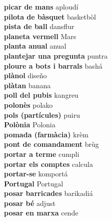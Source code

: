 \textbf{ picar de mans  } aploudí \\
\textbf{ pilota de bàsquet  } basketbòl \\
\textbf{ pista de ball  } dansflur \\
\textbf{ planeta vermell  } Mars \\
\textbf{ planta anual  } anual \\
\textbf{ plantejar una pregunta  } puntra \\
\textbf{ ploure a bots i barrals  } bashá \\
\textbf{ plànol  } diseño \\
\textbf{ plàtan  } banana \\
\textbf{ poll del pubis  } kangreu \\
\textbf{ polonès  } polako \\
\textbf{ pols (partícules)  } puiru \\
\textbf{ Polònia  } Polonia \\
\textbf{ pomada (farmàcia)  } krèm \\
\textbf{ pont de comandament  } brùg \\
\textbf{ portar a terme  } cumpli \\
\textbf{ portar els comptes  } calcula \\
\textbf{ portar-se  } komportá \\
\textbf{ Portugal  } Portugal \\
\textbf{ posar barricades  } barikadiá \\
\textbf{ posar bé  } adjust \\
\textbf{ posar en marxa  } cende \\
